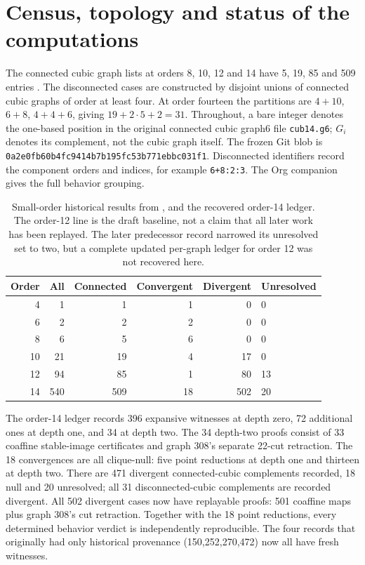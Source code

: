 \documentclass[11pt,a4paper]{article}
\theoremstyle{definition}\newtheorem{definition}[theorem]{Definition}\newtheorem{example}[theorem]{Example}
\theoremstyle{remark}\newtheorem{remark}[theorem]{Remark}
\newcommand{\code}[1]{\texttt{#1}}
\begin{document}
\section{Census, topology and status of the computations}\label{sec:census}
The connected cubic graph lists at orders 8, 10, 12 and 14 have 5, 19, 85 and 509 entries \cite{hog}. The disconnected cases are constructed by disjoint unions of connected cubic graphs of order at least four. At order fourteen the partitions are \(4+10\), \(6+8\), \(4+4+6\), giving \(19+2\cdot5+2=31\). Throughout, a bare integer denotes the one-based position in the original connected cubic graph6 file \code{cub14.g6}; \(G_i\) denotes its complement, not the cubic graph itself. The frozen Git blob is \code{0a2e0fb60b4fc9414b7b195fc53b771ebbc031f1}. Disconnected identifiers record the component orders and indices, for example \code{6+8:2:3}. The Org companion gives the full behavior grouping.

\begin{table}[ht]
\centering
\begin{tabular}{rrrrrl}\toprule
Order & All & Connected & Convergent & Divergent & Unresolved\\\midrule
4 &1&1&1&0&0\\
6 &2&2&2&0&0\\
8 &6&5&6&0&0\\
10 &21&19&4&17&0\\
12 &94&85&1&80&13\\
14 &540&509&18&502&20\\\bottomrule
\end{tabular}
\caption{Small-order historical results from \cite{lagos}, and the recovered order-14 ledger. The order-12 line is the draft baseline, not a claim that all later work has been replayed. The later predecessor record narrowed its unresolved set to two, but a complete updated per-graph ledger for order 12 was not recovered here.}
\end{table}
The order-14 ledger records 396 expansive witnesses at depth zero, 72 additional ones at depth one, and 34 at depth two. The 34 depth-two proofs consist of 33 coaffine stable-image certificates and graph 308's separate 22-cut retraction. The 18 convergences are all clique-null: five point reductions at depth one and thirteen at depth two. There are 471 divergent connected-cubic complements recorded, 18 null and 20 unresolved; all 31 disconnected-cubic complements are recorded divergent. All 502 divergent cases now have replayable proofs: 501 coaffine maps plus graph 308's cut retraction. Together with the 18 point reductions, every determined behavior verdict is independently reproducible. The four records that originally had only historical provenance (150,252,270,472) now all have fresh witnesses.
\end{document}
